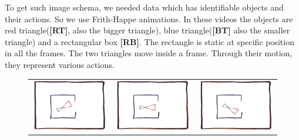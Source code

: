 \def\DevnagVersion{2.15}\documentclass[a4paper, 11pt, notitlepage]{report}
\begin{document}
\hspace*{10pt} To get such image schema, we needed data which has identifiable objects and their actions. So we use Frith-Happe \cite{fhanimation} animations. In these videos the objects are red triangle({\bf [RT]}, also the bigger triangle), blue triangle({\bf [BT]} also the smaller triangle) and a rectangular box {\bf [RB]}. The rectangle is static at specific position in all the frames. The two triangles move inside a frame. Through their motion, they represent various actions.\\

\begin{figure}[h]
\center
\begin{tabular}{ccc}
\includegraphics[scale=0.3]{image/0062.png} & 
\includegraphics[scale=0.3]{image/0063.png} &
\includegraphics[scale=0.3]{image/0068.png}\\


\end{tabular}
\end{figure}
\end{document}
